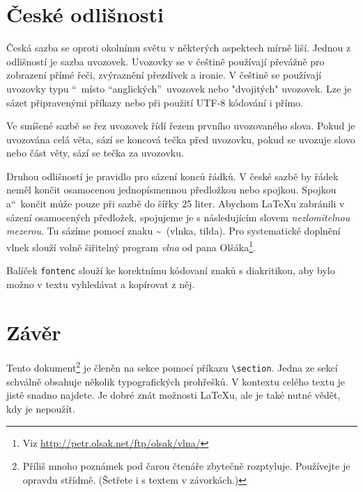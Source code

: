 \documentclass[a4paper, 10pt, twocolumn]{article}
\begin{document}
\section{České odlišnosti}
    Česká sazba se oproti okolnímu světu v některých aspektech mírně liší. Jednou z odlišností je sazba uvozovek. Uvozovky se v češtině používají převážně pro zobrazení přímé řeči, zvýraznění přezdívek a ironie. V češtině se používají uvozovky typu \textquotedblleft\ místo \textquotedblleft anglických\textquotedblright\ uvozovek nebo "dvojitých" uvozovek. Lze je sázet připravenými příkazy nebo při použití UTF-8 kódování i přímo.

    Ve smíšené sazbě se řez uvozovek řídí řezem prvního uvozovaného slova. Pokud je uvozována celá věta, sází se koncová tečka před uvozovku, pokud se uvozuje slovo nebo část věty, sází se tečka za uvozovku.

    Druhou odlišností je pravidlo pro sázení konců řádků. V české sazbě by řádek neměl končit osamocenou jednopísmennou předložkou nebo spojkou. Spojkou \quotedblbase a\textquotedblleft\ končit může pouze při sazbě do šířky 25 liter. Abychom \LaTeX u zabránili v sázení osamocených předložek, spojujeme je s následujícím slovem \emph{nezlomitelnou mezerou}. Tu sázíme pomocí znaku \textasciitilde\ (vlnka, tilda). Pro systematické doplnění vlnek slouží volně šiřitelný program \emph{vlna} od pana Olšáka\footnote[1]{Viz \href{http://petr.olsak.net/ftp/olsak/vlna/}{http://petr.olsak.net/ftp/olsak/vlna/}}.

    Balíček \verb|fontenc|  slouží ke korektnímu kódovaní znaků s diakritikou, aby bylo možno v textu vyhledávat a kopírovat z něj.

\section{Závěr}
    Tento dokument\footnote[2]{Příliš mnoho poznámek pod čarou čtenáře zbytečně rozptyluje. Používejte je opravdu střídmě. (Šetřete i s textem v závorkách.)} je členěn na sekce pomocí příkazu \verb|\section|. Jedna ze sekcí schválně obsahuje několik typografických prohřešků. V kontextu celého textu je jistě snadno najdete. Je dobré znát možnosti \LaTeX u, ale je také nutné vědět, kdy je nepoužít.
\end{document}

